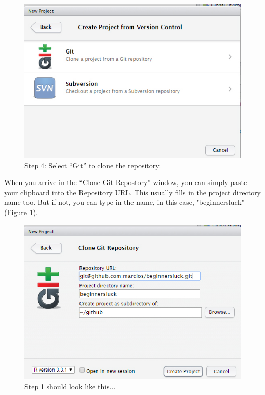 \documentclass[12pt]{../SOP3_beta}
\begin{document}
\begin{figure}
\includegraphics{graphics/RstudioNewProject2.jpg}
\caption{Step 4: Select ``Git'' to clone the repository.}
\end{figure}

When you arrive in the ``Clone Git Repostory'' window, you can simply paste your clipboard into the Repository URL. This usually fills in the project directory name too. But if not, you can type in the name, in this case, "beginnersluck" (Figure \ref{fig:step5}).

\begin{figure}
\includegraphics{graphics/RstudioNewProject3.jpg}
\caption{Step 1 should look like this...}
\label{fig:step5}
\end{figure}
\end{document}
